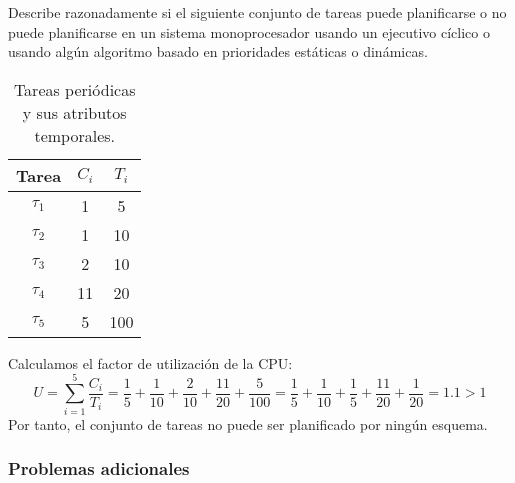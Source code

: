 \begin{ejercicio}\label{ej:rel4_7}
    Describe razonadamente si el siguiente conjunto de tareas puede planificarse o no puede planificarse en un sistema monoprocesador usando un ejecutivo cíclico o usando algún algoritmo basado en prioridades estáticas o dinámicas.
    \begin{table}[H]
    \centering
    \begin{tabular}{|c|c|c|}
        \hline
        Tarea & $C_i$ & $T_i$ \\
        \hline
        $\tau_1$ & 1 & 5 \\
        \hline
        $\tau_2$ & 1 & 10 \\
        \hline
        $\tau_3$ & 2 & 10 \\
        \hline
        $\tau_4$ & 11 & 20 \\
        \hline
        $\tau_5$ & 5 & 100 \\
        \hline
    \end{tabular}
    \caption{Tareas periódicas y sus atributos temporales.}
    \label{tab:4_7}
    \end{table}

    Calculamos el factor de utilización de la CPU\@:
    \begin{equation*}
        U = \sum_{i=1}^{5}\dfrac{C_i}{T_i} = \dfrac{1}{5} + \dfrac{1}{10} + \dfrac{2}{10} + \dfrac{11}{20} + \dfrac{5}{100} = \dfrac{1}{5} + \dfrac{1}{10} + \dfrac{1}{5} + \dfrac{11}{20} + \dfrac{1}{20} = 1.1 > 1
    \end{equation*}
    Por tanto, el conjunto de tareas no puede ser planificado por ningún esquema.
\end{ejercicio}

\subsubsection{Problemas adicionales}

